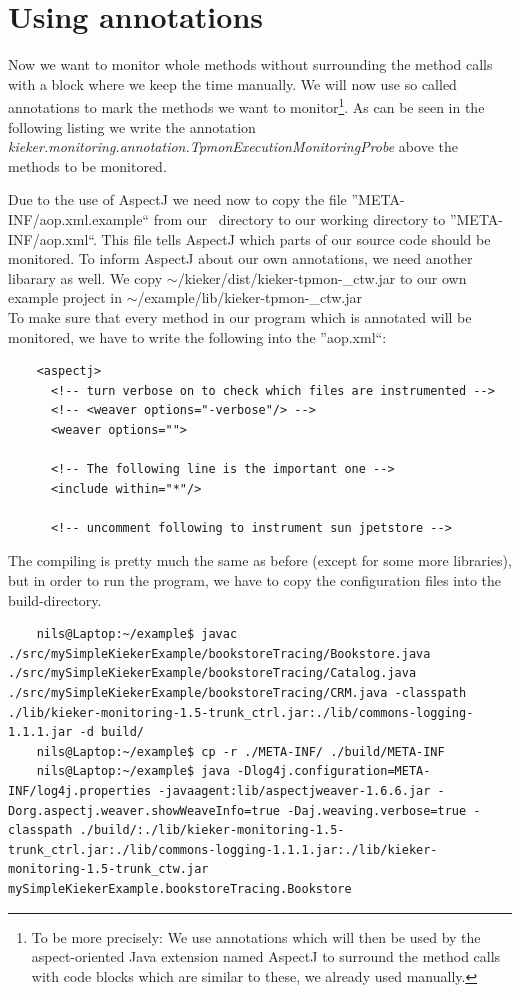     \section{Using annotations}
      Now we want to monitor whole methods without surrounding the method calls with a block where we keep the time manually. We will now use so called annotations to mark the methods we want to monitor\footnote{To be more precisely: We use annotations which will then be used by the aspect-oriented Java extension named AspectJ to surround the method calls with code blocks which are similar to these, we already used manually.}. As can be seen in the following listing we write the annotation \textit{kieker.monitoring.annotation.TpmonExecutionMonitoringProbe} above the methods to be monitored. 
      \setJavaCodeListing
      \lstset{caption=Bookstore.java, label=listing:Bookstore2.java}
      
      Due to the use of AspectJ we need now to copy the file ''META-INF/aop.xml.example`` from our \Kieker\ directory to our working directory to ''META-INF/aop.xml``. This file tells AspectJ which parts of our source code should be monitored. To inform AspectJ about our own annotations, we need another libarary as well. We copy $\sim$/kieker/dist/kieker-tpmon-\version\_ctw.jar to our own example project in $\sim$/example/lib/kieker-tpmon-\version\_ctw.jar\\
      To make sure that every method in our program which is annotated will be monitored, we have to write the following into the ''aop.xml``:
      \setXMLListing 
      \begin{lstlisting}
	<aspectj>
	  <!-- turn verbose on to check which files are instrumented -->
	  <!-- <weaver options="-verbose"/> -->
	  <weaver options="">
	      
	  <!-- The following line is the important one -->
	  <include within="*"/> 

	  <!-- uncomment following to instrument sun jpetstore -->
      \end{lstlisting}
      The compiling is pretty much the same as before (except for some more libraries), but in order to run the program, we have to copy the configuration files into the build-directory.
      \begin{lstlisting}
	nils@Laptop:~/example$ javac ./src/mySimpleKiekerExample/bookstoreTracing/Bookstore.java ./src/mySimpleKiekerExample/bookstoreTracing/Catalog.java ./src/mySimpleKiekerExample/bookstoreTracing/CRM.java -classpath ./lib/kieker-monitoring-1.5-trunk_ctrl.jar:./lib/commons-logging-1.1.1.jar -d build/
	nils@Laptop:~/example$ cp -r ./META-INF/ ./build/META-INF
	nils@Laptop:~/example$ java -Dlog4j.configuration=META-INF/log4j.properties -javaagent:lib/aspectjweaver-1.6.6.jar -Dorg.aspectj.weaver.showWeaveInfo=true -Daj.weaving.verbose=true -classpath ./build/:./lib/kieker-monitoring-1.5-trunk_ctrl.jar:./lib/commons-logging-1.1.1.jar:./lib/kieker-monitoring-1.5-trunk_ctw.jar mySimpleKiekerExample.bookstoreTracing.Bookstore
      \end{lstlisting}